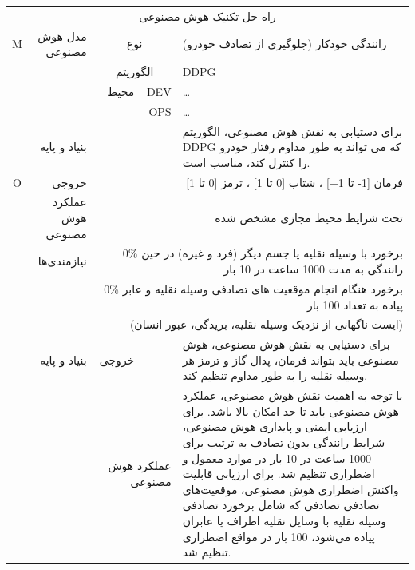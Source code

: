 \documentclass[a4paper,10pt]{article}
\begin{document}
\begin{table}[htbp]
\begin{tabularx}{\textwidth}{c c c c X}
                    \multicolumn{5}{c}{راه حل تکنیک هوش مصنوعی}\\

                    \multicolumn{1}{c}{M} & \multicolumn{1}{r}{مدل هوش مصنوعی} & \multicolumn{2}{c}{نوع} & رانندگی خودکار (جلوگیری از تصادف خودرو) \\
                    &  & \multicolumn{2}{c}{الگوریتم} & DDPG \\
                    &  & \multicolumn{1}{r}{محیط} & \multicolumn{1}{r}{DEV} & \dots \\
                    &  &  & \multicolumn{1}{r}{OPS} & \dots \\
                    & \multicolumn{1}{r}{بنیاد و پایه} &  &  & برای دستیابی به نقش هوش مصنوعی، الگوریتم DDPG که می تواند به طور مداوم رفتار خودرو را کنترل کند، مناسب است. \\

                    \multicolumn{1}{c}{O} & \multicolumn{1}{r}{خروجی} & \multicolumn{3}{r}{فرمان [1- تا 1+] ، شتاب [0 تا 1] ، ترمز [0 تا 1]} \\
                    & \multicolumn{1}{r}{عملکرد هوش مصنوعی} & \multicolumn{3}{r}{تحت شرایط محیط مجازی مشخص شده} \\
                    & \multicolumn{1}{r}{نیازمندی‌ها} & \multicolumn{3}{r}{0\% برخورد با وسیله نقلیه یا جسم دیگر (فرد و غیره) در حین رانندگی به مدت 1000 ساعت در 10 بار} \\
                    &  & \multicolumn{3}{r}{0\% برخورد هنگام انجام موقعیت های تصادفی وسیله نقلیه و عابر پیاده به تعداد 100 بار} \\
                    &  & \multicolumn{3}{r}{(ایست ناگهانی از نزدیک وسیله نقلیه، بریدگی، عبور انسان)} \\
                    & \multicolumn{1}{r}{بنیاد و پایه} & \multicolumn{1}{r}{خروجی} &  & برای دستیابی به نقش هوش مصنوعی، هوش مصنوعی باید بتواند فرمان، پدال گاز و ترمز هر وسیله نقلیه را به طور مداوم تنظیم کند. \\
                    &  & \multicolumn{2}{r}{عملکرد هوش مصنوعی} & با توجه به اهمیت نقش هوش مصنوعی، عملکرد هوش مصنوعی باید تا حد امکان بالا باشد. برای ارزیابی ایمنی و پایداری هوش مصنوعی، شرایط رانندگی بدون تصادف به ترتیب برای 1000 ساعت در 10 بار در موارد معمول و اضطراری تنظیم شد. برای ارزیابی قابلیت واکنش اضطراری هوش مصنوعی، موقعیت‌های تصادفی تصادفی که شامل برخورد تصادفی وسیله نقلیه با وسایل نقلیه اطراف یا عابران پیاده می‌شود، 100 بار در مواقع اضطراری تنظیم شد. \\
                    

\end{tabularx}
\end{table}
\end{document}
